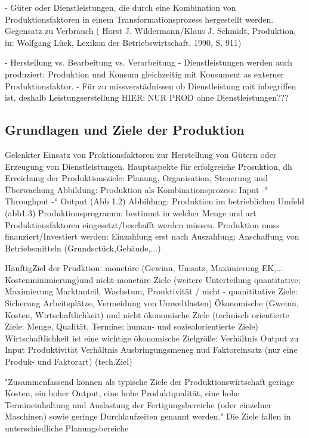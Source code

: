 \documentclass[a4paper,12pt, german]{report}
\begin{document}
- Güter oder Dienstleistungen, die durch eine Kombination von Produktionsfaktoren in einem Transformationsprozess hergestellt werden. Gegensatz zu Verbrauch ( Horst J. Wildermann/Klaus J. Schmidt, Produktion, in: Wolfgang Lück, Lexikon der Betriebswirtschaft, 1990, S. 911)

- Herstellung vs. Bearbeitung vs. Verarbeitung
- Dienstleistungen werden auch produziert: Produktion und Konsum gleichzeitig mit Konsument as externer Produktionsfaktor. 
- Für zu missverstädnissen ob Dienstleistung mit inbegriffen ist, deshalb Leistungserstellung
HIER: NUR PROD ohne Dienstleistungen???

\subsection{Grundlagen und Ziele der Produktion}


Gelenkter Einsatz von Proktionsfaktoren zur Herstellung von Gütern oder Erzeugung von Dienstleistungen. Hauptaspekte für erfolgreiche Prosuktion, dh Erreichung der Produktionsziele: Planung, Organisation, Steuerung und Überwachung 
Abbildung: Produktion als Kombinationsprozess: Input -° Throughput -° Output (Abb 1.2)
Abbildung: Produktion im betrieblichen Umfeld (abb1.3)
Produktionsprogramm: bestimmt in welcher Menge und art Produktionsfaktoren eingesetzt/beschafft werden müssen.
Produktion muss finanziert/Investiert werden: Einzahlung erst nach Auszahlung; Anschaffung von Betriebsmitteln (Grundsctück,Gebäude,...)
\cite{07}

HäuftigZiel der Prudktion: monetäre (Gewinn, Umsatz, Maximierung EK,... Kostenminimierung)und nicht-monetäre Ziele (weitere Unterteilung quantitative: Maximierung Marktanteil, Wachstum, Prouktivität / nicht - quanititative Ziele: Sicherung Arbeitsplätze, Vermeidung von Umweltlasten) 
Ökonomische (Gweinn, Kosten, Wirtschaftlichkeit) und nicht ökonomische Ziele (technisch orientierte Ziele: Menge, Qualität, Termine; human- und soziealorientierte Ziele)
Wirtschaftlichkeit ist eine wichtige ökonomische Zielgröße: Verhältnis Output zu Input
Produktivität Verhältnis Ausbringungsmeneg nud Faktoreinsatz (nur eine Produk- und Faktorart) (tech.Ziel)

"Zusammenfassend können als typische Ziele der Produktionswirtschaft geringe Kosten,
ein hoher Output, eine hohe Produktqualität, eine hohe Termineinhaltung und Auslastung
der Fertigungsbereiche (oder einzelner Maschinen) sowie geringe Durchlaufzeiten
genannt werden." Die Ziele fallen in unterschiedliche Planungsbereiche
\end{document}
